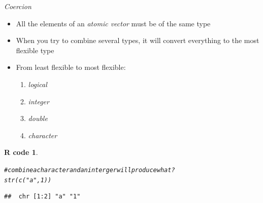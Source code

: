 \documentclass[11pt]{beamer}\usepackage[]{graphicx}\usepackage[]{color}
\makeatletter
\newcommand{\hlnum}[1]{\textcolor[rgb]{0.063,0.58,0.627}{#1}}%
\newcommand{\hlstr}[1]{\textcolor[rgb]{0.063,0.58,0.627}{#1}}%
\newcommand{\hlcom}[1]{\textcolor[rgb]{0.588,0.588,0.588}{#1}}%
\newcommand{\hlstd}[1]{\textcolor[rgb]{0.196,0.196,0.196}{#1}}%
\newcommand{\hlkwd}[1]{\textcolor[rgb]{0.78,0.227,0.412}{#1}}%
\newenvironment{kframe}{%
 \def\at@end@of@kframe{}%
 \ifinner\ifhmode%
  \def\at@end@of@kframe{\end{minipage}}%
  \begin{minipage}{\columnwidth}%
 \fi\fi%
 \def\FrameCommand##1{\hskip\@totalleftmargin \hskip-\fboxsep
 \colorbox{shadecolor}{##1}\hskip-\fboxsep
     \hskip-\linewidth \hskip-\@totalleftmargin \hskip\columnwidth}%
 \MakeFramed {\advance\hsize-\width
   \@totalleftmargin\z@ \linewidth\hsize
   \@setminipage}}%
 {\par\unskip\endMakeFramed%
 \at@end@of@kframe}
\newenvironment{knitrout}{}{} %
\newtheorem{rcode}{R code}[section]
\makeatother
\begin{document}
\begin{frame}[fragile]{\textit{Coercion}}

\begin{itemize}
  \setlength\itemsep{1em}
\item All the elements of an \textit{atomic vector} must be of the same type
\pause \item When you try to combine several types, it will convert everything to the most flexible type
\pause \item From least flexible to most flexible:
\begin{enumerate}
\item \textit{logical} 
\item \textit{integer} 
\item \textit{double} 
\item \textit{character}
\end{enumerate}
\end{itemize}
\begin{knitrout}
\color{fgcolor}\begin{kframe}
\begin{rcode}\label{unnamed-chunk-16}\begin{alltt}
\hlcom{# combine a character and an interger will produce what?}
\hlkwd{str}\hlstd{(}\hlkwd{c}\hlstd{(}\hlstr{"a"}\hlstd{,} \hlnum{1}\hlstd{))}
\end{alltt}
\begin{verbatim}
##  chr [1:2] "a" "1"
\end{verbatim}
\end{rcode}\end{kframe}
\end{knitrout}
\end{frame}
\end{document}
